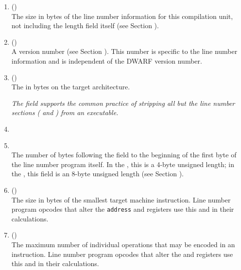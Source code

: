 \begin{enumerate}[1. ]
\item \HFNunitlength{} ()  \\
The size in bytes of the line number information for this
compilation unit, not including the length field itself
(see Section ). 

\item \HFNversion{} (\HFTuhalf) \\
A version number 
(see Section ). 
This number is specific to
the line number information and is independent of the DWARF
version number. 

\item \HFNaddresssize{} (\HFTubyte) \\
\bb
The 
in bytes on the target architecture. 
\eb

\textit{The \HFNaddresssize{} field 
\bb
supports 
\eb
the common practice of stripping all but 
the line number sections (\dotdebugline{} and \dotdebuglinestr{}) 
from an executable.}

\item \HFNreservedwassegmentselectorsize{}
\bbeb
\\

\item \HFNheaderlength{}  \\
The number of bytes following the \HFNheaderlength{} field to the
beginning of the first byte of the line number program itself.
In the \thirtytwobitdwarfformat, this is a 4-byte unsigned
length; in the \sixtyfourbitdwarfformat, this field is an
8-byte unsigned length 
(see Section ). 

\item \HFNminimuminstructionlength{} (\HFTubyte)  \\
The size in bytes of the smallest target machine
instruction. Line number program opcodes that alter
the \texttt{address} and 
registers use this and \HFNmaximumoperationsperinstruction{}
in their calculations. 

\item \HFNmaximumoperationsperinstruction{} (\HFTubyte) \\
The maximum number of individual operations that may be
encoded in an instruction. Line number program opcodes
that alter the \LNSREGaddress{} and 
\LNSREGopindex{} registers use this and
\HFNminimuminstructionlength{} in their calculations.


\end{enumerate}
